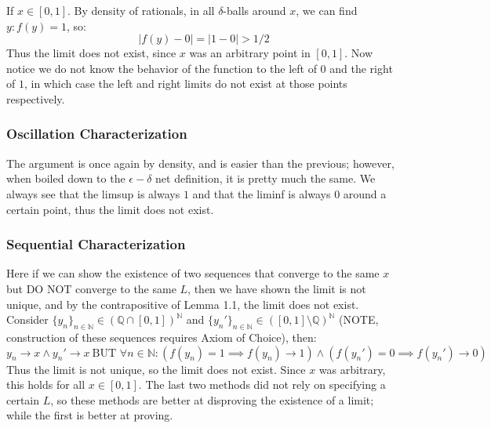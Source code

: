 \documentclass[10pt,letterpaper]{article} %
\begin{document}
If $x \in [0, 1]$. By density of rationals, in all $\delta$-balls around $x$, we can find $y: f(y) = 1$, so:
\begin{equation*}
|f(y) - 0| = |1-0| > 1/2
\end{equation*}
Thus the limit does not exist, since $x$ was an arbitrary point in $[0, 1]$. Now notice we do not know the behavior of the function to the left of $0$ and the right of $1$, in which case the left and right limits do not exist at those points respectively.

\medskip
\subsubsection*{Oscillation Characterization}
The argument is once again by density, and is easier than the previous; however, when boiled down to the $\epsilon-\delta$ net definition, it is pretty much the same. We always see that the limsup is always $1$ and that the liminf is always $0$ around a certain point, thus the limit does not exist. 

\medskip
\subsubsection*{Sequential Characterization}
Here if we can show the existence of two sequences that converge to the same $x$ but DO NOT converge to the same $L$, then we have shown the limit is not unique, and by the contrapositive of Lemma 1.1, the limit does not exist.\\

Consider $\{y_n\}_{n \in \mathbb{N}} \in (\mathbb{Q} \cap [0, 1])^\mathbb{N}$ and $\{y_n'\}_{n \in \mathbb{N}} \in ([0, 1] \setminus \mathbb{Q})^\mathbb{N}$ (NOTE, construction of these sequences requires Axiom of Choice), then:
\begin{equation*}
  y_n \xrightarrow{} x \land y_n' \xrightarrow{}x \ \text{BUT } \forall n \in \mathbb{N}: (f(y_n) = 1 \implies f(y_n) \xrightarrow{} 1) \land (f(y_n') = 0 \implies f(y_n') \xrightarrow{} 0)
\end{equation*}
Thus the limit is not unique, so the limit does not exist. Since $x$ was arbitrary, this holds for all $x \in [0, 1]$. The last two methods did not rely on specifying a certain $L$, so these methods are better at disproving the existence of a limit; while the first is better at proving.

\medskip
\end{document}
